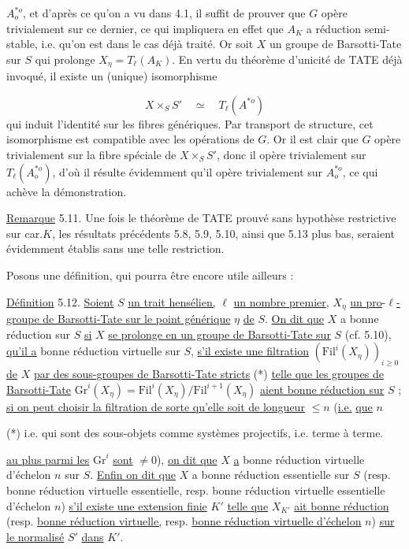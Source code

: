 $A^{*o}_o$, et d'après ce qu'on a vu dans 4.1, il suffit de prouver que $G$ opère trivialement sur ce dernier, ce qui impliquera en effet que $A_K$ a réduction semi-stable, i.e. qu'on est dans le cas déjà traité. Or soit $X$ un groupe de Barsotti-Tate sur $S$ qui prolonge $X_\eta = T_\ell(A_K)$. En vertu du théorème d'unicité de TATE déjà invoqué, il existe un (unique) isomorphisme

\begin{equation*}
X \times_S S' \quad \simeq \quad T_\ell(A^{*o})
\end{equation*}
qui induit l'identité sur les fibres génériques. Par transport de structure, cet isomorphisme est compatible avec les opérations de $G$. Or il est clair que $G$ opère trivialement sur la fibre spéciale de $X \times_S S'$, donc il opère trivialement sur $T_\ell(A^{*o}_o)$, d'où il résulte évidemment qu'il opère trivialement sur $A^{*o}_o$, ce qui achève la démonstration.

\underline{Remarque} 5.11. Une fois le théorème de TATE prouvé sans hypothèse restrictive sur car.$K$, les résultats précédents 5.8, 5.9, 5.10, ainsi que 5.13 plus bas, seraient évidemment établis sans une telle restriction.

Posons une définition, qui pourra être encore utile ailleurs :

\underline{Définition} 5.12. \underline{Soient} $S$ \underline{un trait hensélien,} $\ell$ \underline{un nombre premier}, $X_\eta$ \underline{un pro}-$\ell$\underline{-groupe de Barsotti-Tate sur le point générique} $\eta$ \underline{de} $S$. \underline{On dit que} $X$ a bonne réduction sur $S$ \underline{si} $X$ \underline{se prolonge en un groupe de Barsotti-Tate sur} $S$ (cf. 5.10), \underline{qu'il a} bonne réduction virtuelle sur $S$, \underline{s'il existe une filtration} $(\mathrm{Fil}^i(X_\eta))_{i \geq 0}$ \underline{de} $X$ \underline{par des sous-groupes de Barsotti-Tate stricts} (*) \underline{telle que les groupes de Barsotti-Tate} $\mathrm{Gr}^i(X_\eta) = \mathrm{Fil}^i(X_\eta)/\mathrm{Fil}^{i+1}(X_\eta)$ \underline{aient bonne réduction sur} $S$ ; \underline{si on peut choisir la filtration de sorte qu'elle soit de longueur} $\leq n$ (\underline{i.e.} \underline{que} $n$

(*) i.e. qui sont des sous-objets comme systèmes projectifs, i.e. terme à terme.



\underline{au plus parmi les} $\mathrm{Gr}^i$ \underline{sont} $\neq 0$), \underline{on dit que} $X$ \underline{a} bonne réduction virtuelle d'échelon $n$ sur $S$. \underline{Enfin on dit que} $X$ a bonne réduction essentielle sur $S$ (resp. bonne réduction virtuelle essentielle, resp. bonne réduction virtuelle essentielle d'échelon $n$) \underline{s'il existe une extension finie} $K'$ \underline{telle que} $X_{K'}$ \underline{ait bonne réduction} (resp. \underline{bonne réduction virtuelle,} resp. \underline{bonne réduction virtuelle d'échelon} $n$) \underline{sur le normalisé} $S'$ \underline{dans} $K'$.

